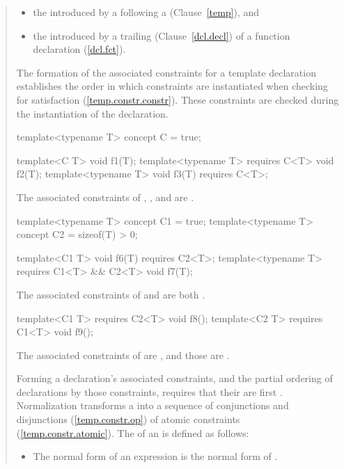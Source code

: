 \begin{quote}
\begin{addedblock}
\begin{itemize}
\begin{itemize}
\item the  introduced
      by a  following a 
       (Clause~\ref{temp}), and

\item the  introduced by a trailing 
       (Clause~\ref{dcl.decl}) 
      of a function declaration (\ref{dcl.fct}).
\end{itemize}
\end{itemize}
% 
The formation of the associated constraints for a template declaration
establishes the order in which constraints are instantiated when checking 
for satisfaction (\ref{temp.constr.constr}).
% 
\enternote
These constraints are checked during the instantiation of the declaration.
\exitnote
% 
\enterexample
\begin{codeblock}
template<typename T> concept C = true;

template<C T> void f1(T);
template<typename T> requires C<T> void f2(T);
template<typename T> void f3(T) requires C<T>;
\end{codeblock}
The associated constraints of , , and 
are .
% 
\begin{codeblock}
template<typename T> concept C1 = true;
template<typename T> concept C2 = sizeof(T) > 0;

template<C1 T> void f6(T) requires C2<T>;
template<typename T> requires C1<T> && C2<T> void f7(T);
\end{codeblock}
The associated constraints of  and  are both
.
% 
\begin{codeblock}
template<C1 T> requires C2<T> void f8();
template<C2 T> requires C1<T> void f9();
\end{codeblock}
% 
The associated constraints of  are
, and those  are
.
\exitexample

\pnum
Forming a declaration's associated constraints,
and the partial ordering of declarations by those constraints,
requires that their 
are first .
% 
Normalization transforms a  into a sequence of 
conjunctions and disjunctions (\ref{temp.constr.op})
of atomic constraints (\ref{temp.constr.atomic}).
% 
The  of an   is 
defined as follows:
% 
\begin{itemize}
\item The normal form of an expression  is the normal form
of .


\end{itemize}
\end{addedblock}
\end{quote}
